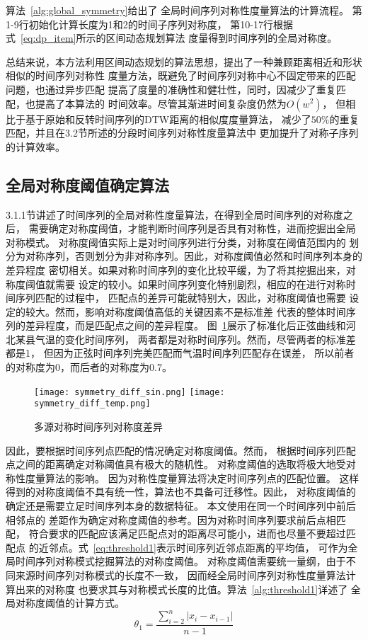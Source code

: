 算法~\ref{alg:global_symmetry}给出了
全局时间序列对称性度量算法的计算流程。
第1-9行初始化计算长度为1和2的时间子序列对称度，
第10-17行根据式~\ref{eq:dp_item}所示的区间动态规划算法
度量得到时间序列的全局对称度。

总结来说，本方法利用区间动态规划的算法思想，提出了一种兼顾距离相近和形状相似的时间序列对称性
度量方法，既避免了时间序列对称中心不固定带来的匹配问题，也通过异步匹配
提高了度量的准确性和健壮性，同时，因减少了重复匹配，也提高了本算法的
时间效率。尽管其渐进时间复杂度仍然为$O\left(w^{2}\right)$，
但相比于基于原始和反转时间序列的DTW距离的相似度度量算法，
减少了$50 \%$的重复匹配，并且在3.2节所述的分段时间序列对称性度量算法中
更加提升了对称子序列的计算效率。

\subsection{全局对称度阈值确定算法}
3.1.1节讲述了时间序列的全局对称性度量算法，在得到全局时间序列的对称度之后，
需要确定对称度阈值，才能判断时间序列是否具有对称性，进而挖掘出全局对称模式。
对称度阈值实际上是对时间序列进行分类，对称度在阈值范围内的
划分为对称序列，否则划分为非对称序列。因此，对称度阈值必然和时间序列本身的差异程度
密切相关。如果对称时间序列的变化比较平缓，为了将其挖掘出来，对称度阈值就需要
设定的较小。如果时间序列变化特别剧烈，相应的在进行对称时间序列匹配的过程中，
匹配点的差异可能就特别大，因此，对称度阈值也需要
设定的较大。然而，影响对称度阈值高低的关键因素不是标准差
代表的整体时间序列的差异程度，而是匹配点之间的差异程度。
图~\ref{fig:symmetry_diff}展示了标准化后正弦曲线和河北某县气温的变化时间序列，
两者都是对称时间序列。然而，尽管两者的标准差都是1，
但因为正弦时间序列完美匹配而气温时间序列匹配存在误差，
所以前者的对称度为0，而后者的对称度为0.7。
\begin{figure}
  \centering
  {\texttt{[image: symmetry\_diff\_sin.png]}}
  {\texttt{[image: symmetry\_diff\_temp.png]}}
  \caption{多源对称时间序列对称度差异}
  \label{fig:symmetry_diff}
\end{figure}

因此，要根据时间序列点匹配的情况确定对称度阈值。然而，
根据时间序列匹配点之间的距离确定对称阈值具有极大的随机性。
对称度阈值的选取将极大地受对称性度量算法的影响。
因为对称性度量算法将决定时间序列点的匹配位置。
这样得到的对称度阈值不具有统一性，算法也不具备可迁移性。因此，
对称度阈值的确定还是需要立足时间序列本身的数据特征。
本文使用在同一个时间序列中前后相邻点的
差距作为确定对称度阈值的参考。因为对称时间序列要求前后点相匹配，
符合要求的匹配应该满足匹配点对的距离尽可能小，进而也尽量不要超过匹配点
的近邻点。式~\ref{eq:threshold1}表示时间序列近邻点距离的平均值，
可作为全局时间序列对称模式挖掘算法的对称度阈值。
对称度阈值需要统一量纲，由于不同来源时间序列对称模式的长度不一致，
因而经全局时间序列对称性度量算法计算出来的对称度
也要求其与对称模式长度的比值。算法~\ref{alg:threshold1}详述了
全局对称度阈值的计算方式。
\begin{equation}
  \theta_{1}=\frac{\sum_{i=2}^{n}\left|x_{i}-x_{i-1}\right|}{n-1}
  \label{eq:threshold1}
\end{equation}

